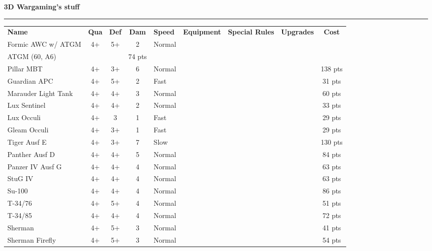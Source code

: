 \documentclass[11pt]{article}
\newcommand{\UnitTable}[1]{
  \centering
  \hyphenpenalty=100000
  \setlength\tabcolsep{2 pt}
  \rowcolors{1}{white}{lgrey}
  \footnotesize
  \begin{tabularx}{\linewidth}{lccclXXcc}
    \bf Name & \bf Qua& \bf Def& \bf Dam & \bf Speed &\bf Equipment& \bf Special Rules& \bf Upgrades& \bf Cost\\
    #1
  \end{tabularx}
}
\newcommand{\myarmytitle}[1]{
  \begin{center}
  \Huge{\bf#1}
  \end{center}
  \hrule
}
\begin{document}
\newpage

\myarmytitle{3D Wargaming's stuff}

\UnitTable{


  Formic AWC w/ ATGM & 4+ & 5+ & 2 & Normal & \makecell[l]{20mm Cannon
    (36, A2)\\ATGM (60, A6)} & & & 74 pts\\

  Pillar MBT & 4+ & 3+ & 6 & Normal & \makecell[l]{Heavy Cannon (72, A6)} & &
  & 138 pts\\

  Guardian APC & 4+ & 5+ & 2 & Fast & \makecell[l]{Autocannon (36,
    A1)} & & & 31 pts\\

  Marauder Light Tank & 4+ & 4+ & 3 & Normal & \makecell[l]{Light
    Cannon (48, A4)} & & & 60 pts\\

  Lux Sentinel & 4+ & 4+ & 2 & Normal & \makecell[l]{Laser Cutter (24,
    A3)} & & & 33 pts\\

  Lux Occuli & 4+ & 3 & 1 & Fast & \makecell[l]{Laser Cutter (24,
    A3)} & & & 29 pts\\

  Gleam Occuli & 4+ & 3+ & 1 & Fast & \makecell[l]{Laser Blaster (12,
    A6)} & & & 29 pts\\

  Tiger Ausf E & 4+ & 3+ & 7 & Slow & \makecell[l]{8.8cm cannon (60,
    A5)} & & & 130 pts\\

  Panther Ausf D & 4+ & 4+ & 5 & Normal & \makecell[l]{7.5cm cannon
    (48, A4)} & & & 84 pts\\

  Panzer IV Ausf G & 4+ & 4+ & 4 & Normal & \makecell[l]{7.5 cm
    cannon (30, A4)} & & & 63 pts\\

  StuG IV & 4+ & 4+ & 4 & Normal & \makecell[l]{7.5 cm cannon (30,
    A4)} & & & 63 pts\\

  Su-100 & 4+ & 4+ & 4 & Normal & \makecell[l]{100mm cannon (60,
    A5)} & & & 86 pts\\

  T-34/76 & 4+ & 5+ & 4 & Normal & \makecell[l]{76mm cannon (30,
    A3)} & & & 51 pts\\

  T-34/85 & 4+ & 4+ & 4 & Normal & \makecell[l]{85mm cannon (48,
    A4)} & & & 72 pts\\
  
  Sherman & 4+ & 5+ & 3 & Normal & \makecell[l]{75mm cannon (30,
    A3)} & & & 41 pts\\

  Sherman Firefly & 4+ & 5+ & 3 & Normal & \makecell[l]{76.2mm cannon
    (48, A4)} & & & 54 pts\\

}
\end{document}
